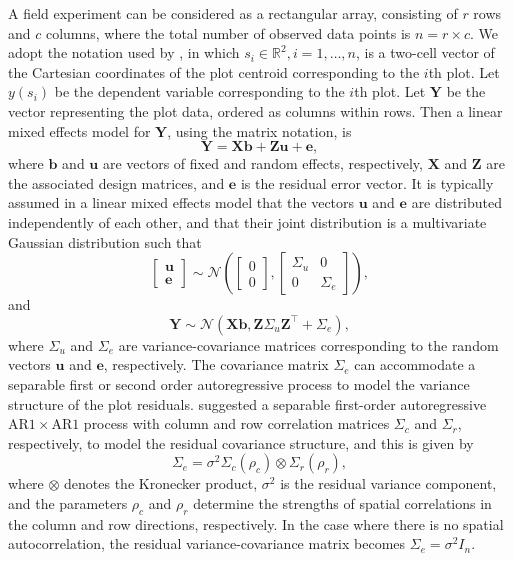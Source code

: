 \documentclass[a4paper]{article}   	%
\newcommand{\N}{\mathcal{N}}
\newcommand{\AR}{\mathrm{AR}1}
\begin{document}
	A field experiment can be considered as a rectangular array, consisting of $r$ rows and $c$ columns, where the total number of observed data points is $n= r\times c$. We adopt the notation used by \textcite{Zimmerman1991Randoma}, in which $s_i\in \mathbb{R}^2, i=1,\ldots,n$, is a two-cell vector of the Cartesian coordinates of the plot centroid corresponding to the $i$th plot. Let $y(s_i)$ be the dependent variable corresponding to the $i$th plot. Let $\bm{Y}$ be the vector representing the plot data, ordered as columns within rows. Then a linear mixed effects model for $\bm{Y}$, using the matrix notation, is 
	\begin{equation}\label{eq:modelmatrix}
		\bm{Y} = \bm{X}\bm{b}+\bm{Z}\bm{u}+\bm{e},
	\end{equation}
	where $\bm{b}$ and $\bm{u}$ are vectors of fixed and random effects, respectively, $\bm{X}$ and $\bm{Z}$ are the associated design matrices, and $\bm{e}$ is the residual error vector. It is typically assumed in a linear mixed effects model that the vectors $\bm{u}$ and $\bm{e}$ are distributed independently of each other, and that their joint distribution is a multivariate Gaussian distribution such that
	\begin{equation}\label{eq:covariance}
		\begin{bmatrix}
			\bm{u} \\ \bm{e}
		\end{bmatrix} \sim \N\left( \begin{bmatrix}
			0\\0 \end{bmatrix}, \begin{bmatrix}
			\Sigma_u & 0 \\ 0 & \Sigma_e
		\end{bmatrix}\right),
	\end{equation}
	and 
	\begin{equation}\label{eq:distributionY}
		\bm{Y} \sim \N(\bm{X}\bm{b},\bm{Z}\Sigma_u\bm{Z}^\top+\Sigma_e),
	\end{equation}
	where $\Sigma_u$ and $\Sigma_e$ are variance-covariance matrices corresponding to the random vectors $\bm{u}$ and $\bm{e}$, respectively. The covariance matrix $\Sigma_e$ can accommodate a separable first or second order autoregressive process to model the variance structure of the plot residuals. \textcite{Gilmour1997Accounting} suggested a separable first-order autoregressive $\AR\times \AR$ process with column and row correlation matrices $\Sigma_c$ and $\Sigma_r$, respectively, to model the residual covariance structure, and this is given by 
	\begin{equation}\label{eq:ar1}
		\Sigma_e =\sigma^2\Sigma_c(\rho_c) \otimes \Sigma_r(\rho_r),
	\end{equation}
	where $\otimes$ denotes the Kronecker product, $\sigma^2$ is the residual variance component, and the parameters $\rho_c$ and $\rho_r$ determine the strengths of spatial correlations in the column and row directions, respectively. In the case where there is no spatial autocorrelation, the residual variance-covariance matrix becomes $\Sigma_e=\sigma^2 I_n$. 
	
\end{document}
